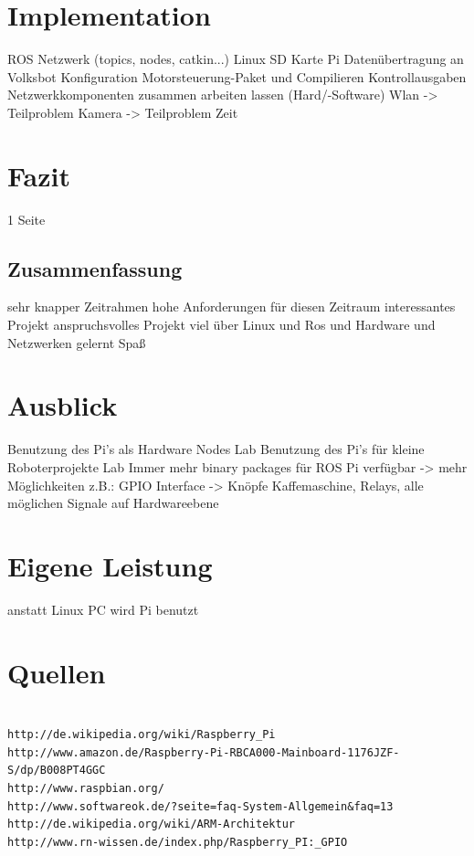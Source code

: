 \documentclass[12pt]{article}
\begin{document}
\section{Implementation}

ROS Netzwerk (topics, nodes, catkin...)
Linux SD Karte Pi
Datenübertragung an Volksbot
Konfiguration Motorsteuerung-Paket und Compilieren
Kontrollausgaben 
Netzwerkkomponenten zusammen arbeiten lassen (Hard/-Software)
Wlan -> Teilproblem
Kamera -> Teilproblem Zeit


\section{Fazit}
1 Seite
\subsection{Zusammenfassung}

sehr knapper Zeitrahmen
hohe Anforderungen für diesen Zeitraum
interessantes Projekt
anspruchsvolles Projekt
viel über Linux und Ros und Hardware und Netzwerken gelernt
Spaß

\section{Ausblick}

Benutzung des Pi's als Hardware Nodes Lab
Benutzung des Pi's für kleine Roboterprojekte Lab
Immer mehr binary packages für ROS Pi verfügbar -> mehr Möglichkeiten
z.B.: GPIO Interface -> Knöpfe Kaffemaschine, Relays, alle möglichen Signale
auf Hardwareebene

\section{Eigene Leistung}

anstatt Linux PC wird Pi benutzt

\section{Quellen}
\begin{verbatim}

http://de.wikipedia.org/wiki/Raspberry_Pi
http://www.amazon.de/Raspberry-Pi-RBCA000-Mainboard-1176JZF-S/dp/B008PT4GGC
http://www.raspbian.org/
http://www.softwareok.de/?seite=faq-System-Allgemein&faq=13
http://de.wikipedia.org/wiki/ARM-Architektur
http://www.rn-wissen.de/index.php/Raspberry_PI:_GPIO

\end{verbatim}
\end{document}
